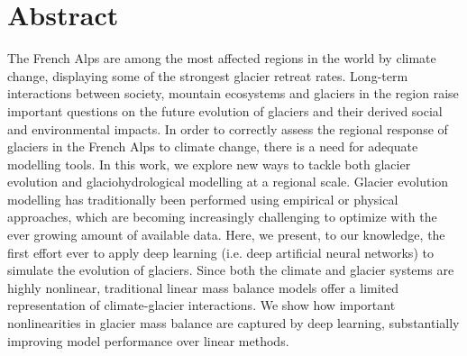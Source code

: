 
\section*{Abstract}

The French Alps are among the most affected regions in the world by climate change, displaying some of the strongest glacier retreat rates. Long-term interactions between society, mountain ecosystems and glaciers in the region raise important questions on the future evolution of glaciers and their derived social and environmental impacts. In order to correctly assess the regional response of glaciers in the French Alps to climate change, there is a need for adequate modelling tools. In this work, we explore new ways to tackle both glacier evolution and glaciohydrological modelling at a regional scale. Glacier evolution modelling has traditionally been performed using empirical or physical approaches, which are becoming increasingly challenging to optimize with the ever growing amount of available data. Here, we present, to our knowledge, the first effort ever to apply deep learning (i.e. deep artificial neural networks) to simulate the evolution of glaciers. Since both the climate and glacier systems are highly nonlinear, traditional linear mass balance models offer a limited representation of climate-glacier interactions. We show how important nonlinearities in glacier mass balance are captured by deep learning, substantially improving model performance over linear methods. 

